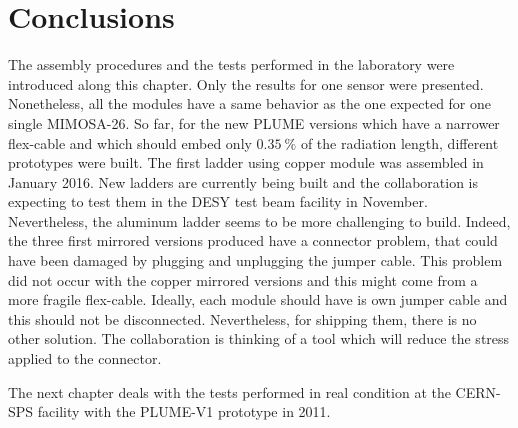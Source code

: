 \section{Conclusions}

  The assembly procedures and the tests performed in the laboratory were introduced along this chapter.
  Only the results for one sensor were presented.
  Nonetheless, all the modules have a same behavior as the one expected for one single MIMOSA-26.
  So far, for the new PLUME versions which have a narrower flex-cable and which should embed only $0.35~\%$ of the radiation length, different prototypes were built. 
  The first ladder using copper module was assembled in January 2016.
  New ladders are currently being built and the collaboration is expecting to test them in the DESY test beam facility in November.
  Nevertheless, the aluminum ladder seems to be more challenging to build.
  Indeed, the three first mirrored versions produced have a connector problem, that could have been damaged by plugging and unplugging the jumper cable.
  This problem did not occur with the copper mirrored versions and this might come from a more fragile flex-cable.
  Ideally, each module should have is own jumper cable and this should not be disconnected.
  Nevertheless, for shipping them, there is no other solution.
  The collaboration is thinking of a tool which will reduce the stress applied to the connector.

  The next chapter deals with the tests performed in real condition at the CERN-SPS facility with the PLUME-V1 prototype in 2011.


